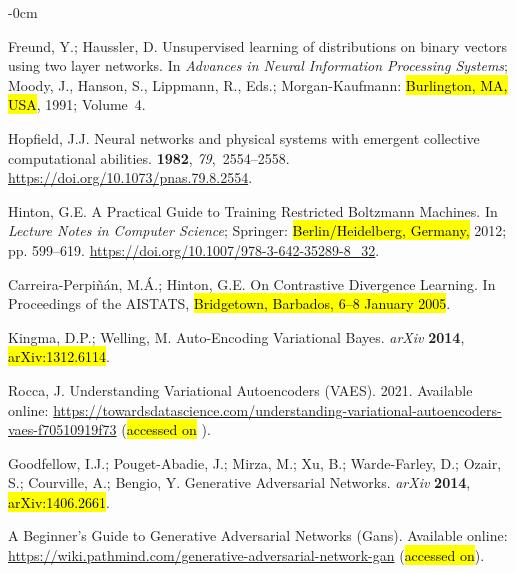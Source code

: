 \documentclass[technologies,article,accept,pdftex,moreauthors]{Definitions/mdpi}
\begin{document}
\begin{adjustwidth}{-\extralength}{0cm}
\begin{thebibliography}{999}
Freund, Y.; Haussler, D.
\newblock Unsupervised learning of distributions on binary vectors using two
  layer networks.
\newblock In \emph{Advances in Neural Information Processing
  Systems}; Moody, J., Hanson, S., Lippmann, R., Eds.; Morgan-Kaufmann: \hl{Burlington, MA, USA}, 1991; Volume~4.

Hopfield, J.J.
\newblock Neural networks and physical systems with emergent collective
  computational abilities.
 {\bf 1982},
  {\em 79},~2554--2558.  {\url{https://doi.org/10.1073/pnas.79.8.2554}}.

Hinton, G.E.
\newblock A Practical Guide to Training Restricted Boltzmann Machines. In {\em   Lecture Notes in Computer Science}; Springer:  \hl{Berlin/Heidelberg, Germany,} %
  2012; pp. 599--619. {\url{https://doi.org/10.1007/978-3-642-35289-8_32}}.

Carreira-Perpi{\~n}{\'a}n, M.{\'A}.; Hinton, G.E. On Contrastive Divergence Learning. In Proceedings of the AISTATS, \hl{Bridgetown, Barbados, 6--8 January 2005}. %


Kingma, D.P.; Welling, M. Auto-Encoding Variational Bayes.  \emph{arXiv} \textbf{2014},  \hl{arXiv:1312.6114}.

Rocca, J. Understanding Variational Autoencoders (VAES). 2021.  Available online: \url{https://towardsdatascience.com/understanding-variational-autoencoders-vaes-f70510919f73} (\hl{accessed on}%
). 

Goodfellow, I.J.; Pouget-Abadie, J.; Mirza, M.; Xu, B.; Warde-Farley, D.;
  Ozair, S.; Courville, A.; Bengio, Y.
\newblock Generative Adversarial Networks. \emph{arXiv} \textbf{2014},  \hl{ arXiv:1406.2661}.  

A Beginner's Guide to Generative Adversarial Networks (Gans). Available online: \url{https://wiki.pathmind.com/generative-adversarial-network-gan} (\hl{accessed on}).


\end{thebibliography}
\end{adjustwidth}
\end{document}
